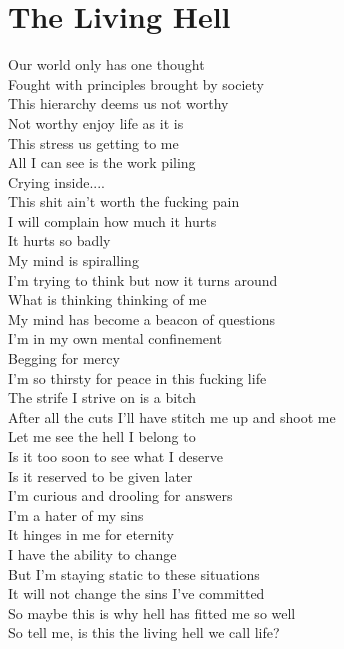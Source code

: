\documentclass[12pt, b5paper, oneside]{book}
\begin{document}
\section{The Living Hell}
Our world only has one thought
\\Fought with principles brought by society
\\This hierarchy deems us not worthy
\\Not worthy enjoy life as it is
\\This stress us getting to me
\\All I can see is the work piling
\\Crying inside....
\\This shit ain't worth the fucking pain
\\I will complain how much it hurts
\\It hurts so badly
\\My mind is spiralling
\\I'm trying to think but now it turns around
\\What is thinking thinking of me
\\My mind has become a beacon of questions
\\I'm in my own mental confinement
\\Begging for mercy
\\I'm so thirsty for peace in this fucking life
\\The strife I strive on is a bitch
\\After all the cuts I'll have stitch me up and shoot me
\\Let me see the hell I belong to
\\Is it too soon to see what I deserve
\\Is it reserved to be given later
\\I'm curious and drooling for answers
\\I'm a hater of my sins
\\It hinges in me for eternity
\\I have the ability to change
\\But I'm staying static to these situations
\\It will not change the sins I've committed
\\So maybe this is why hell has fitted me so well
\\So tell me, is this the living hell we call life? 
\newpage
\end{document}
